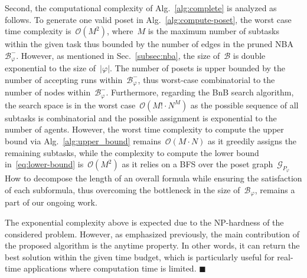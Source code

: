 Second, the computational complexity of Alg.~\ref{alg:complete}
is analyzed as follows. To generate one valid poset in Alg.~\ref{alg:compute-poset},
the worst case time complexity is~$\mathcal{O}(M^2)$, where~$M$ is the maximum
number of subtasks within the given task thus bounded by the number of edges in the
pruned NBA~$\mathcal{B}^-_{\varphi}$.
However, as mentioned in Sec.~\ref{subsec:nba},
the size of~$\mathcal{B}$ is double exponential to the size of~$|\varphi|$.
The number of posets is upper bounded by the number of accepting runs
within~$\mathcal{B}^-_{\varphi}$, thus worst-case combinatorial to
the number of nodes within~$\mathcal{B}^-_{\varphi}$.
Furthermore, regarding the BnB search algorithm, the search space is in the worst
case~$\mathcal{O}(M!\cdot N^M)$ as the possible sequence of all subtasks
is combinatorial and the possible assignment is exponential to the
number of agents.
However, the worst time complexity to compute the upper bound via Alg.~\ref{alg:upper_bound}
remains~$\mathcal{O}(M\cdot N)$ as it greedily assigns the remaining subtasks,
while the complexity to compute the lower bound
in~\eqref{eq:lower-bound} is~$\mathcal{O}(M^2)$ as it relies on a BFS over
the poset graph~$\mathcal{G}_{P_\varphi}$
How to decompose the length of an overall formula while ensuring
the satisfaction of each subformula, thus overcoming the bottleneck
in the size of~$\mathcal{B}_{\varphi}$, remains a part of our ongoing work.

\begin{remark}\label{remark:anytime}
The exponential complexity above is expected due to the NP-hardness of the considered problem.
However, as emphasized previously, the main contribution of the proposed algorithm
is the anytime property.
In other words, it can return the best solution within the given time budget,
which is particularly useful for real-time applications where computation time is limited.
\hfill  $\blacksquare$
\end{remark}
